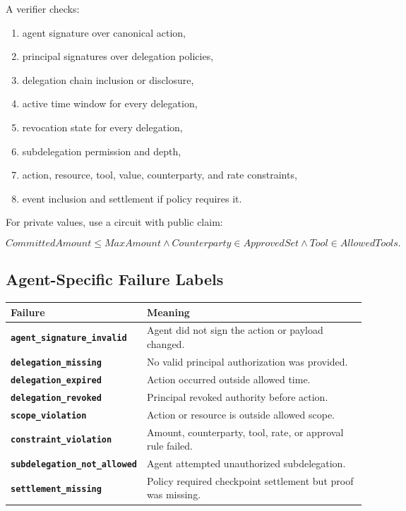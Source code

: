 \documentclass[11pt]{article}
\begin{document}
A verifier checks:

\begin{enumerate}
    \item agent signature over canonical action,
    \item principal signatures over delegation policies,
    \item delegation chain inclusion or disclosure,
    \item active time window for every delegation,
    \item revocation state for every delegation,
    \item subdelegation permission and depth,
    \item action, resource, tool, value, counterparty, and rate constraints,
    \item event inclusion and settlement if policy requires it.
\end{enumerate}

For private values, use a circuit with public claim:

\begin{equation}
CommittedAmount \leq MaxAmount \land Counterparty \in ApprovedSet \land Tool \in AllowedTools.
\end{equation}

\subsection{Agent-Specific Failure Labels}

\begin{center}
\begin{tabularx}{\textwidth}{>{\bfseries}p{} X}
\toprule
Failure & Meaning \\
\midrule
\texttt{agent\_signature\_invalid} & Agent did not sign the action or payload changed. \\
\texttt{delegation\_missing} & No valid principal authorization was provided. \\
\texttt{delegation\_expired} & Action occurred outside allowed time. \\
\texttt{delegation\_revoked} & Principal revoked authority before action. \\
\texttt{scope\_violation} & Action or resource is outside allowed scope. \\
\texttt{constraint\_violation} & Amount, counterparty, tool, rate, or approval rule failed. \\
\texttt{subdelegation\_not\_allowed} & Agent attempted unauthorized subdelegation. \\
\texttt{settlement\_missing} & Policy required checkpoint settlement but proof was missing. \\
\bottomrule
\end{tabularx}
\end{center}
\end{document}
